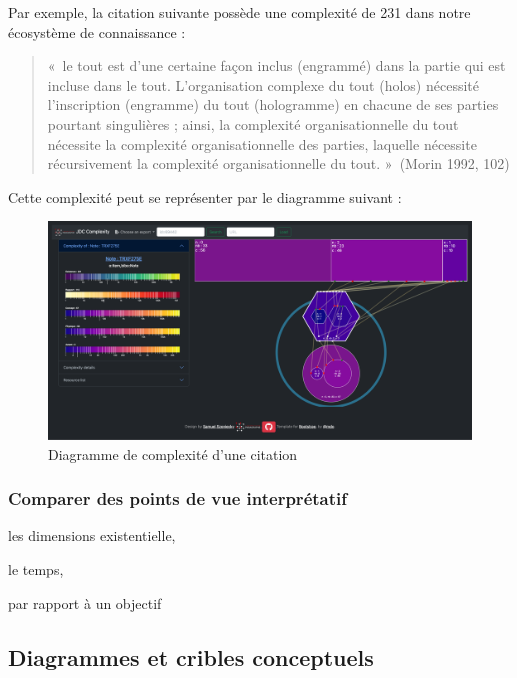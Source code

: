 \documentclass[
  letterpaper,
  DIV=11,
  numbers=noendperiod]{scrreprt}
\begin{document}
Par exemple, la citation suivante possède une complexité de 231 dans
notre écosystème de connaissance :

\begin{quote}
«~le tout est d'une certaine façon inclus (engrammé) dans la partie qui
est incluse dans le tout. L'organisation complexe du tout (holos)
nécessité l'inscription (engramme) du tout (hologramme) en chacune de
ses parties pourtant singulières ; ainsi, la complexité
organisationnelle du tout nécessite la complexité organisationnelle des
parties, laquelle nécessite récursivement la complexité
organisationnelle du tout. »~(Morin 1992, 102)
\end{quote}

Cette complexité peut se représenter par le diagramme suivant :

\begin{figure}

{\centering \includegraphics{images/localhost_samszo_HDR_jdcComplexityCita.png}

}

\caption{\label{fig-ComplexityCita}Diagramme de complexité d'une
citation}

\end{figure}

\hypertarget{comparer-des-points-de-vue-interpruxe9tatif}{%
\subsubsection{Comparer des points de vue
interprétatif}\label{comparer-des-points-de-vue-interpruxe9tatif}}

les dimensions existentielle,

le temps,

par rapport à un objectif

\hypertarget{sec-diagrammesCribles}{%
\subsection{Diagrammes et cribles
conceptuels}\label{sec-diagrammesCribles}}
\end{document}
